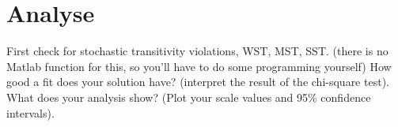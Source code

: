 \section*{Analyse}
\label{Analyse}
%
First check for stochastic transitivity violations, WST, MST, SST. (there is no Matlab function for this, so you’ll have to do some programming yourself)
How good a fit does your solution have? (interpret the result of the chi-square test).
What does your analysis show? (Plot your scale values and 95\% confidence intervals).


